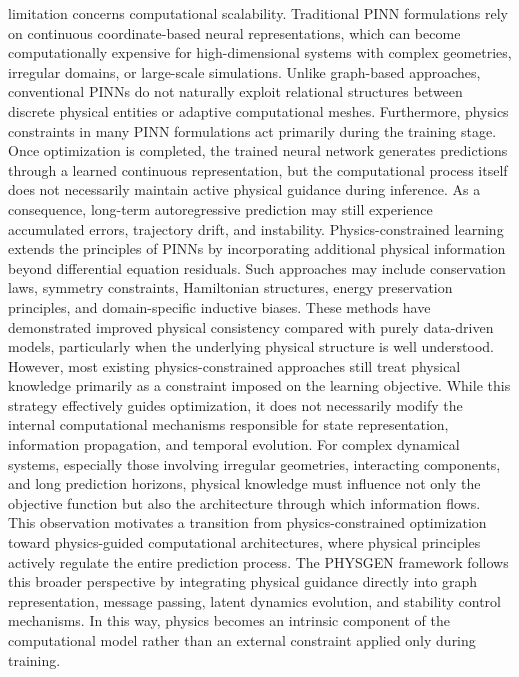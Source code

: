 limitation concerns computational scalability. Traditional PINN formulations rely on continuous coordinate-based neural representations, which can become computationally expensive for high-dimensional systems with complex geometries, irregular domains, or large-scale simulations. Unlike graph-based approaches, conventional PINNs do not naturally exploit relational structures between discrete physical entities or adaptive computational meshes. Furthermore, physics constraints in many PINN formulations act primarily during the training stage. Once optimization is completed, the trained neural network generates predictions through a learned continuous representation, but the computational process itself does not necessarily maintain active physical guidance during inference. As a consequence, long-term autoregressive prediction may still experience accumulated errors, trajectory drift, and instability. Physics-constrained learning extends the principles of PINNs by incorporating additional physical information beyond differential equation residuals. Such approaches may include conservation laws, symmetry constraints, Hamiltonian structures, energy preservation principles, and domain-specific inductive biases. These methods have demonstrated improved physical consistency compared with purely data-driven models, particularly when the underlying physical structure is well understood. However, most existing physics-constrained approaches still treat physical knowledge primarily as a constraint imposed on the learning objective. While this strategy effectively guides optimization, it does not necessarily modify the internal computational mechanisms responsible for state representation, information propagation, and temporal evolution. For complex dynamical systems, especially those involving irregular geometries, interacting components, and long prediction horizons, physical knowledge must influence not only the objective function but also the architecture through which information flows. This observation motivates a transition from physics-constrained optimization toward physics-guided computational architectures, where physical principles actively regulate the entire prediction process. The PHYSGEN framework follows this broader perspective by integrating physical guidance directly into graph representation, message passing, latent dynamics evolution, and stability control mechanisms. In this way, physics becomes an intrinsic component of the computational model rather than an external constraint applied only during training. \] 